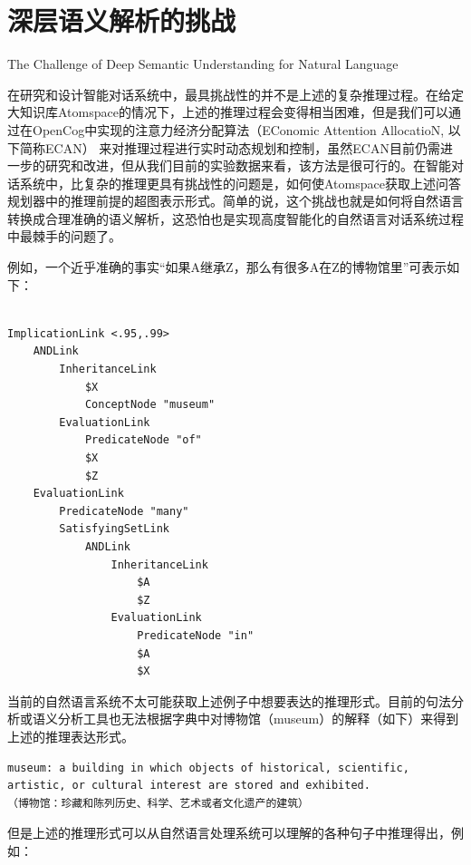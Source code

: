 \section{深层语义解析的挑战}{The Challenge of Deep Semantic Understanding for Natural Language}

在研究和设计智能对话系统中，最具挑战性的并不是上述的复杂推理过程。在给定大知识库Atomspace的情况下，上述的推理过程会变得相当困难，但是我们可以通过在OpenCog中实现的注意力经济分配算法（EConomic Attention AllocatioN, 以下简称ECAN）\cite{Goertzel2010} 来对推理过程进行实时动态规划和控制，虽然ECAN目前仍需进一步的研究和改进，但从我们目前的实验数据来看，该方法是很可行的。在智能对话系统中，比复杂的推理更具有挑战性的问题是，如何使Atomspace获取上述问答规划器中的推理前提的超图表示形式。简单的说，这个挑战也就是如何将自然语言转换成合理准确的语义解析，这恐怕也是实现高度智能化的自然语言对话系统过程中最棘手的问题了。

例如，一个近乎准确的事实“如果A继承Z，那么有很多A在Z的博物馆里”可表示如下：

{\tt\begin{small}\begin{lstlisting}

ImplicationLink <.95,.99>
	ANDLink
		InheritanceLink
			$X
			ConceptNode "museum"
		EvaluationLink
			PredicateNode "of"
			$X
			$Z
	EvaluationLink
		PredicateNode "many"
		SatisfyingSetLink
			ANDLink
				InheritanceLink
					$A
					$Z
				EvaluationLink
					PredicateNode "in"
					$A
					$X

\end{lstlisting}\end{small}}

\noindent 当前的自然语言系统不太可能获取上述例子中想要表达的推理形式。目前的句法分析或语义分析工具也无法根据字典中对博物馆（museum）的解释（如下）来得到上述的推理表达形式。

\begin{verbatim}
museum: a building in which objects of historical, scientific, artistic, or cultural interest are stored and exhibited.
（博物馆：珍藏和陈列历史、科学、艺术或者文化遗产的建筑）
\end{verbatim}

\noindent 但是上述的推理形式可以从自然语言处理系统可以理解的各种句子中推理得出，例如：

